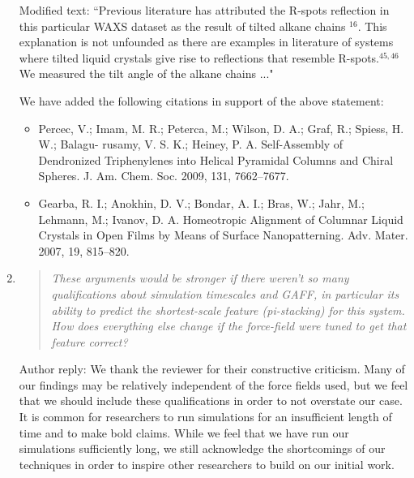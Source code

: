 \documentclass{article}
\begin{document}
\begin{enumerate}
    Modified text: ``Previous literature has attributed the R-spots reflection
    in this particular WAXS dataset as the result of tilted alkane
    chains $^{16}$. {\color{red} This explanation is not  %
    unfounded as there are examples in literature of systems where tilted liquid
    crystals give rise to reflections that resemble R-spots.$^{45,46}$} We
    measured the tilt angle of the alkane chains ..."
    
    We have added the following citations in support of the above statement:
    \begin{itemize}
    
    \item Percec, V.; Imam, M. R.; Peterca, M.; Wilson, D. A.; Graf, R.; Spiess, H. W.; Balagu-
    rusamy, V. S. K.; Heiney, P. A. Self-Assembly of Dendronized Triphenylenes into Helical
    Pyramidal Columns and Chiral Spheres. J. Am. Chem. Soc. 2009, 131, 7662–7677.

    \item Gearba, R. I.; Anokhin, D. V.; Bondar, A. I.; Bras, W.; Jahr, M.; Lehmann, M.;
    Ivanov, D. A. Homeotropic Alignment of Columnar Liquid Crystals in Open Films by
    Means of Surface Nanopatterning. Adv. Mater. 2007, 19, 815–820.
    
    \end{itemize}

    \item \begin{quote}
    \textit{These arguments would be stronger if there weren't so many
	    qualifications about simulation timescales and GAFF, in particular its ability
	    to predict the shortest-scale feature (pi-stacking) for this system. How does
	    everything else change if the force-field were tuned to get that feature
	    correct?}
    \end{quote}

    Author reply: We thank the reviewer for their constructive criticism. Many
    of our findings may be relatively independent of the force fields used, but we
    feel that we should include these qualifications in order to not overstate our
    case. It is common for researchers to run simulations for an insufficient
    length of time and to make bold claims. While we feel that we have run our 
    simulations sufficiently long, we still acknowledge the shortcomings of our
    techniques in order to inspire other researchers to build on our initial work. 


\end{enumerate}
\end{document}
